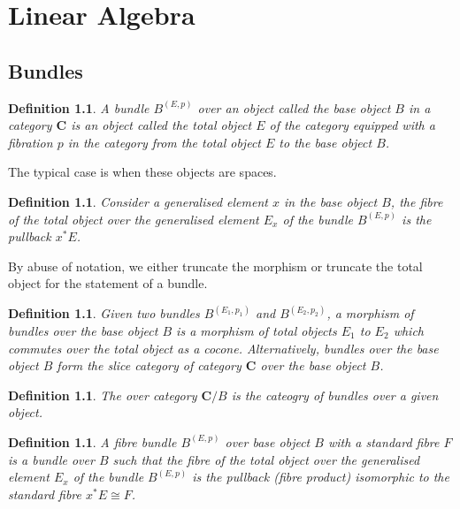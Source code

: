 \documentclass{tufte-book}
\newtheorem{definition}[theorem]{Definition}
\begin{document}
\chapter{Linear Algebra}
\label{ch:lin-alg}

\section{Bundles}

\begin{definition}
	A bundle $B^{(E,p)}$ over an object called the base object $B$ in a category $\mathbf{C}$ is an object called the total object $E$ of the category equipped with a fibration $p$ in the category from the total object $E$ to the base object $B$.
\end{definition}

The typical case is when these objects are spaces.

\begin{definition}
	Consider a generalised element $x$ in the base object $B$, the fibre of the total object over the generalised element $E_x$ of the bundle $B^{(E, p)}$ is the pullback $x^*E$.
\end{definition}

By abuse of notation, we either truncate the morphism or truncate the total object for the statement of a bundle.

\begin{definition}
	Given two bundles $B^{(E_1, p_1)}$ and $B^{(E_2, p_2)}$, a morphism of bundles over the base object $B$ is a morphism of total objects $E_1$ to $E_2$ which commutes over the total object as a cocone. Alternatively, bundles over the base object $B$ form the slice category of category $\mathbf{C}$ over the base object $B$. 
\end{definition}

\begin{definition}
	The over category $\mathbf{C} / B$ is the cateogry of bundles over a given object.
\end{definition}

\begin{definition}
	A fibre bundle $B^{(E, p)}$ over base object $B$ with a standard fibre $F$ is a bundle over $B$ such that the fibre of the total object over the generalised element $E_x$ of the bundle $B^{(E, p)}$ is the pullback (fibre product) isomorphic to the standard fibre $x^*E \cong F$.
\end{definition}
\end{document}
